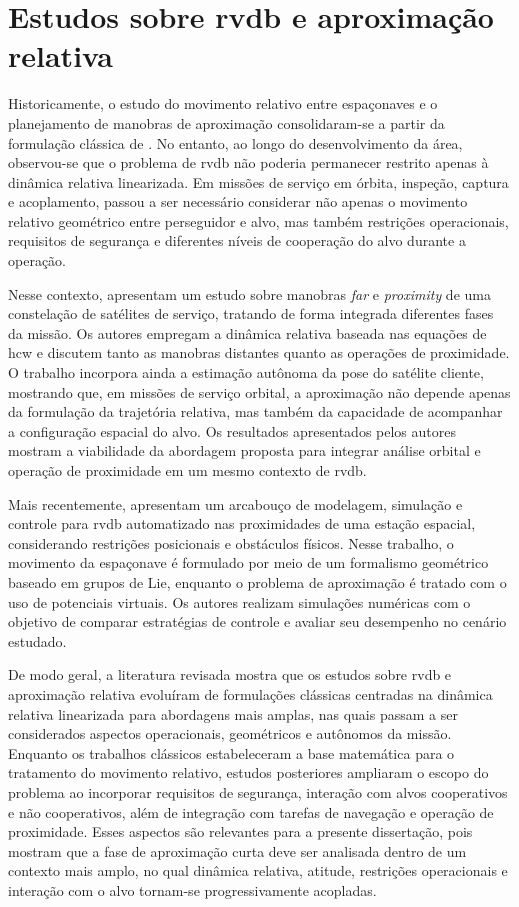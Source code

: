 \section{Estudos sobre \gls{rvdb} e aproximação relativa}
\label{sec_evolucao_rendezvous_aproximacao_relativa}

Historicamente, o estudo do movimento relativo entre espaçonaves e o planejamento de manobras de aproximação consolidaram-se a partir da formulação clássica de \cite{clohessy1960terminal}. 
No entanto, ao longo do desenvolvimento da área, observou-se que o problema de \gls{rvdb} não poderia permanecer restrito apenas à dinâmica relativa linearizada.
Em missões de serviço em órbita, inspeção, captura e acoplamento, passou a ser necessário considerar não apenas o movimento relativo geométrico entre perseguidor e alvo, mas também restrições operacionais, requisitos de segurança e diferentes níveis de cooperação do alvo durante a operação.

Nesse contexto, \cite{arantes2010far} apresentam um estudo sobre manobras \textit{far} e \textit{proximity} de uma constelação de satélites de serviço, tratando de forma integrada diferentes fases da missão. Os autores empregam a dinâmica relativa baseada nas equações de \gls{hcw} e discutem tanto as manobras distantes quanto as operações de proximidade. O trabalho incorpora ainda a estimação autônoma da pose do satélite cliente, mostrando que, em missões de serviço orbital, a aproximação não depende apenas da formulação da trajetória relativa, mas também da capacidade de acompanhar a configuração espacial do alvo. Os resultados apresentados pelos autores mostram a viabilidade da abordagem proposta para integrar análise orbital e operação de proximidade em um mesmo contexto de \gls{rvdb}.

Mais recentemente, \cite{fiori2024modeling} apresentam um arcabouço de modelagem, simulação e controle para \gls{rvdb} automatizado nas proximidades de uma estação espacial, considerando restrições posicionais e obstáculos físicos. Nesse trabalho, o movimento da espaçonave é formulado por meio de um formalismo geométrico baseado em grupos de Lie, enquanto o problema de aproximação é tratado com o uso de potenciais virtuais. Os autores realizam simulações numéricas com o objetivo de comparar estratégias de controle e avaliar seu desempenho no cenário estudado.

De modo geral, a literatura revisada mostra que os estudos sobre \gls{rvdb} e aproximação relativa evoluíram de formulações clássicas centradas na dinâmica relativa linearizada para abordagens mais amplas, nas quais passam a ser considerados aspectos operacionais, geométricos e autônomos da missão. Enquanto os trabalhos clássicos estabeleceram a base matemática para o tratamento do movimento relativo, estudos posteriores ampliaram o escopo do problema ao incorporar requisitos de segurança, interação com alvos cooperativos e não cooperativos, além de integração com tarefas de navegação e operação de proximidade. Esses aspectos são relevantes para a presente dissertação, pois mostram que a fase de aproximação curta deve ser analisada dentro de um contexto mais amplo, no qual dinâmica relativa, atitude, restrições operacionais e interação com o alvo tornam-se progressivamente acopladas.